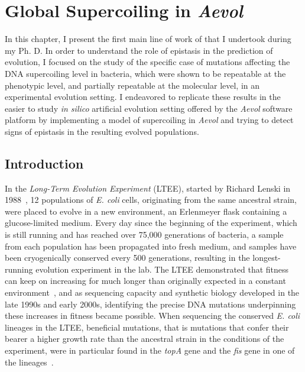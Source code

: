 \chapter{Global Supercoiling in \emph{Aevol}}
\label{chap:aevol}

In this chapter, I present the first main line of work of that I undertook during my Ph. D.
In order to understand the role of epistasis in the prediction of evolution, I focused on the study of the specific case of mutations affecting the DNA supercoiling level in bacteria, which were shown to be repeatable at the phenotypic level,  and partially repeatable at the molecular level, in an experimental evolution setting.
I endeavored to replicate these results in the easier to study \emph{in silico} artificial evolution setting offered by the \emph{Aevol} software platform by implementing a model of supercoiling in \emph{Aevol} and trying to detect signs of epistasis in the resulting evolved populations.

\section{Introduction}
\label{sec:aevol:intro}

In the \emph{Long-Term Evolution Experiment} (LTEE), started by Richard Lenski in 1988~\citep{lenski1991}, 12 populations of \emph{E. coli} cells, originating from the same ancestral strain, were placed to evolve in a new environment, an Erlenmeyer flask containing a glucose-limited medium.
Every day since the beginning of the experiment, which is still running and has reached over 75,000 generations of bacteria, a sample from each population has been propagated into fresh medium, and samples have been cryogenically conserved every 500 generations, resulting in the longest-running evolution experiment in the lab.
The LTEE demonstrated that fitness can keep on increasing for much longer than originally expected in a constant environment~\citep{good2017}, and as sequencing capacity and synthetic biology developed in the late 1990s and early 2000s, identifying the precise DNA mutations underpinning these increases in fitness became possible.
When sequencing the conserved \emph{E. coli} lineages in the LTEE, beneficial mutations, that is mutations that confer their bearer a higher growth rate than the ancestral strain in the conditions of the experiment, were in particular found in the \emph{topA} gene  and the \emph{fis} gene in one of the lineages~\citep{crozat2005}.


